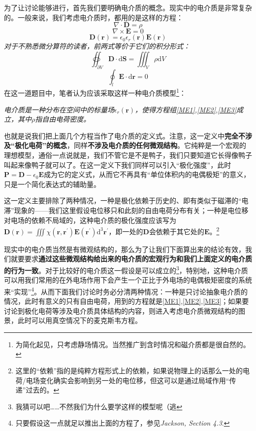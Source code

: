 \documentclass{ctexart}
\newcommand{\epsz}{\epsilon_0}
\newcommand{\epsr}{\epsilon_r}
\begin{document}
	为了让讨论能够进行，首先我们要明确电介质的概念。现实中的电介质是非常复杂的。一般来说，我们考虑电介质时，都用的是这样的方程：
	\begin{equation}\label{ME1}
	\nabla\cdot\mathbf D=\rho
	\end{equation}
	\begin{equation}\label{ME2}
	\nabla\times\mathbf E=0
	\end{equation}
	\begin{equation}\label{ME3}
	\mathbf D(\mathbf r)=\epsilon_0\epsr(\mathbf r)\mathbf E(\mathbf r)
	\end{equation}
	\textit{对于不熟悉微分算符的读者，前两式等价于它们的积分形式：}
	\begin{equation}\label{ME1I}
	\oiint_{\partial V} \mathbf D\cdot \mathrm d\mathbf S=\iiint_V\rho \mathrm dV
	\end{equation}
	\begin{equation}\label{ME2I}
	\oint_l \mathbf E\cdot\mathrm d\mathbf r=0
	\end{equation}
	在这一道题目中，笔者认为应该采取这样一种电介质模型\footnote{为简化起见，只考虑静场情况。当然推广到含时情况和磁介质都是很自然的。}：
	
	{\itshape 电介质是一种分布在空间中的标量场$\epsr(\mathbf r)$，使得方程组\eqref{ME1},\eqref{ME2},\eqref{ME3}成立，其中$\rho$指自由电荷密度。}

	也就是说我们把上面几个方程当作了电介质的定义式。注意，这一定义中\textbf{完全不涉及“极化电荷”的概念}，同样\textbf{不涉及电介质的任何微观结构}。它纯粹是一个宏观的理想模型，通俗一点说就是，我们不管它是不是鸭子，我们只要知道它长得像鸭子叫起来像鸭子就可以了。在这一定义下我们同样可以引入“极化强度”，此时$\mathbf P=\mathbf D-\epsz\mathbf E$成为它的定义式，从而它不再具有“单位体积内的电偶极矩”的意义，只是一个简化表达式的辅助量。
	
	这一定义主要排除了两种情况，一种是极化依赖于历史的、即有类似于磁滞的“电滞”现象的——我们这里假设电位移只和此刻的自由电荷分布有关；一种是电位移对电场的依赖不局域的，这种电介质的极化强度应该写为$\mathbf D(\mathbf r)=\iiint \chi(\mathbf r,\mathbf r^\prime)\mathbf E(\mathbf r^\prime)\mathrm d^3\mathbf r^\prime$，即一处的$\mathbf D$会依赖于其它处的$\mathbf E$。\footnote{这里的“依赖”指的是纯粹方程形式上的依赖，如果说物理上的话那么一处的电荷/电场变化确实会影响到另一处的电位移，但这可以是通过局域作用“传递”过去的。}
	
	现实中的电介质当然是有微观结构的，那么为了让我们下面算出来的结论有效，我们就要要求\textbf{通过这些微观结构给出来的电介质的宏观行为和我们上面定义的电介质的行为一致}。对于比较好的电介质这一假设是可以成立的\footnote{我猜可以吧……不然我们为什么要学这样的模型呢（逃}，特别地，这种电介质可以用我们常用的在外电场作用下会产生一个正比于外电场的电偶极矩密度的系统来“实现”\footnote{只要假设这一点就足以推出上面的方程了，参见\textit{Jackson, Section 4.3}.}。从而下面我们讨论时务必分清两种情况：一种是只讨论抽象电介质的情况，此时有意义的只有自由电荷，用到的方程就是\eqref{ME1},\eqref{ME2},\eqref{ME3}；如果要讨论到极化电荷等涉及电介质具体结构的内容，则进入考虑电介质微观结构的图景，此时可以用真空情况下的麦克斯韦方程。
	
\end{document}

